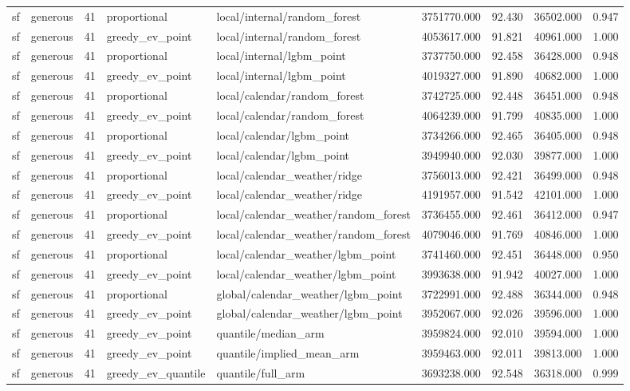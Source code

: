 \begin{tabular}{llrllrrrr}
sf & generous & 41 & proportional & local/internal/random\_forest & 3751770.000 & 92.430 & 36502.000 & 0.947 \\
sf & generous & 41 & greedy\_ev\_point & local/internal/random\_forest & 4053617.000 & 91.821 & 40961.000 & 1.000 \\
sf & generous & 41 & proportional & local/internal/lgbm\_point & 3737750.000 & 92.458 & 36428.000 & 0.948 \\
sf & generous & 41 & greedy\_ev\_point & local/internal/lgbm\_point & 4019327.000 & 91.890 & 40682.000 & 1.000 \\
sf & generous & 41 & proportional & local/calendar/random\_forest & 3742725.000 & 92.448 & 36451.000 & 0.948 \\
sf & generous & 41 & greedy\_ev\_point & local/calendar/random\_forest & 4064239.000 & 91.799 & 40835.000 & 1.000 \\
sf & generous & 41 & proportional & local/calendar/lgbm\_point & 3734266.000 & 92.465 & 36405.000 & 0.948 \\
sf & generous & 41 & greedy\_ev\_point & local/calendar/lgbm\_point & 3949940.000 & 92.030 & 39877.000 & 1.000 \\
sf & generous & 41 & proportional & local/calendar\_weather/ridge & 3756013.000 & 92.421 & 36499.000 & 0.948 \\
sf & generous & 41 & greedy\_ev\_point & local/calendar\_weather/ridge & 4191957.000 & 91.542 & 42101.000 & 1.000 \\
sf & generous & 41 & proportional & local/calendar\_weather/random\_forest & 3736455.000 & 92.461 & 36412.000 & 0.947 \\
sf & generous & 41 & greedy\_ev\_point & local/calendar\_weather/random\_forest & 4079046.000 & 91.769 & 40846.000 & 1.000 \\
sf & generous & 41 & proportional & local/calendar\_weather/lgbm\_point & 3741460.000 & 92.451 & 36448.000 & 0.950 \\
sf & generous & 41 & greedy\_ev\_point & local/calendar\_weather/lgbm\_point & 3993638.000 & 91.942 & 40027.000 & 1.000 \\
sf & generous & 41 & proportional & global/calendar\_weather/lgbm\_point & 3722991.000 & 92.488 & 36344.000 & 0.948 \\
sf & generous & 41 & greedy\_ev\_point & global/calendar\_weather/lgbm\_point & 3952067.000 & 92.026 & 39596.000 & 1.000 \\
sf & generous & 41 & greedy\_ev\_point & quantile/median\_arm & 3959824.000 & 92.010 & 39594.000 & 1.000 \\
sf & generous & 41 & greedy\_ev\_point & quantile/implied\_mean\_arm & 3959463.000 & 92.011 & 39813.000 & 1.000 \\
sf & generous & 41 & greedy\_ev\_quantile & quantile/full\_arm & 3693238.000 & 92.548 & 36318.000 & 0.999 \\
\bottomrule
\end{tabular}
